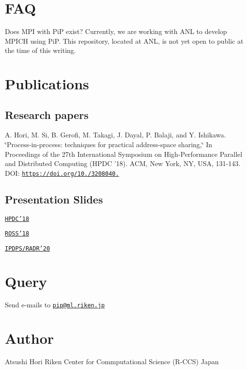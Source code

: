 \section*{F\-A\-Q}


\begin{DoxyItemize}
\item Does M\-P\-I with Pi\-P exist? Currently, we are working with A\-N\-L to develop M\-P\-I\-C\-H using Pi\-P. This repository, located at A\-N\-L, is not yet open to public at the time of this writing.
\end{DoxyItemize}

\section*{Publications}

\subsection*{Research papers}

A. Hori, M. Si, B. Gerofi, M. Takagi, J. Dayal, P. Balaji, and Y. Ishikawa. \char`\"{}\-Process-\/in-\/process\-: techniques for practical address-\/space sharing,\char`\"{} In Proceedings of the 27th International Symposium on High-\/\-Performance Parallel and Distributed Computing (H\-P\-D\-C '18). A\-C\-M, New York, N\-Y, U\-S\-A, 131-\/143. D\-O\-I\-: \href{https://doi.org/10.1145/3208040.3208045}{\tt https\-://doi.\-org/10./3208040.}

\subsection*{Presentation Slides}


\begin{DoxyItemize}
\item \href{presentation/HPDC18-PiP.key.pdf}{\tt H\-P\-D\-C'18}
\item \href{presentation/Ross-2018-PiP.key.pdf}{\tt R\-O\-S\-S'18}
\item \href{presentation/IPDPS20-RADRws.key.pdf}{\tt I\-P\-D\-P\-S/\-R\-A\-D\-R'20}
\end{DoxyItemize}

\section*{Query}

Send e-\/mails to \href{mailto:pip@ml.riken.jp}{\tt pip@ml.\-riken.\-jp}

\section*{Author}

Atsushi Hori Riken Center for Commputational Science (R-\/\-C\-C\-S) Japan 